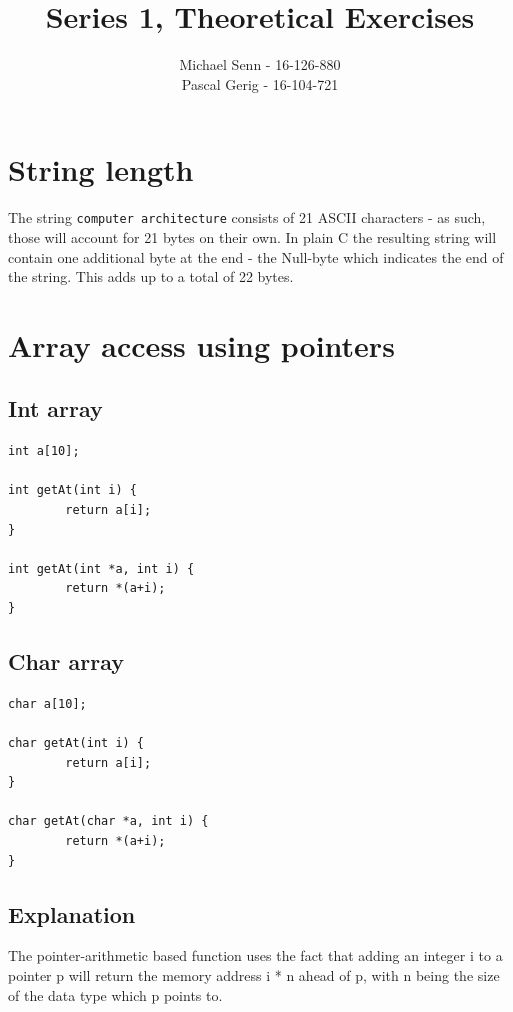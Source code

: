 \documentclass[a4paper]{scrartcl}
\title{Series 1, Theoretical Exercises}
\author{Michael Senn - 16-126-880\\ Pascal Gerig - 16-104-721}
\date{}
\begin{document}
\maketitle


\section{String length}

The string \texttt{computer architecture} consists of 21 ASCII characters - as
such, those will account for 21 bytes on their own. In plain C the resulting
string will contain one additional byte at the end - the Null-byte which
indicates the end of the string. This adds up to a total of 22 bytes.

\section{Array access using pointers}

\subsection{Int array}

\begin{lstlisting}
int a[10];

int getAt(int i) {
        return a[i];
}

int getAt(int *a, int i) {
        return *(a+i);
}
\end{lstlisting}


\subsection{Char array}


\begin{lstlisting}
char a[10];

char getAt(int i) {
        return a[i];
}

char getAt(char *a, int i) {
        return *(a+i);
}
\end{lstlisting}

\subsection{Explanation}

The pointer-arithmetic based function uses the fact that adding an integer i to
a pointer p will return the memory address i * n ahead of p, with n being the
size of the data type which p points to.
\end{document}
